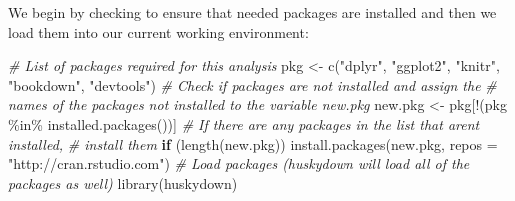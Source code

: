 \documentclass [11pt, proquest] {uwthesis}[2015/03/03]
\newenvironment{Shaded}{\begin{snugshade}}{\end{snugshade}}
\newcommand{\AttributeTok}[1]{\textcolor[rgb]{0.77,0.63,0.00}{#1}}
\newcommand{\CommentTok}[1]{\textcolor[rgb]{0.56,0.35,0.01}{\textit{#1}}}
\newcommand{\ControlFlowTok}[1]{\textcolor[rgb]{0.13,0.29,0.53}{\textbf{#1}}}
\newcommand{\FunctionTok}[1]{\textcolor[rgb]{0.00,0.00,0.00}{#1}}
\newcommand{\NormalTok}[1]{#1}
\newcommand{\OtherTok}[1]{\textcolor[rgb]{0.56,0.35,0.01}{#1}}
\newcommand{\SpecialCharTok}[1]{\textcolor[rgb]{0.00,0.00,0.00}{#1}}
\newcommand{\StringTok}[1]{\textcolor[rgb]{0.31,0.60,0.02}{#1}}
\begin{document}
We begin by checking to ensure that needed packages are installed and then we load them into our current working environment:
\begin{Shaded}
\begin{Highlighting}[]
\CommentTok{\# List of packages required for this analysis}
\NormalTok{pkg }\OtherTok{\textless{}{-}} \FunctionTok{c}\NormalTok{(}\StringTok{"dplyr"}\NormalTok{, }\StringTok{"ggplot2"}\NormalTok{, }\StringTok{"knitr"}\NormalTok{, }\StringTok{"bookdown"}\NormalTok{, }\StringTok{"devtools"}\NormalTok{)}
\CommentTok{\# Check if packages are not installed and assign the}
\CommentTok{\# names of the packages not installed to the variable new.pkg}
\NormalTok{new.pkg }\OtherTok{\textless{}{-}}\NormalTok{ pkg[}\SpecialCharTok{!}\NormalTok{(pkg }\SpecialCharTok{\%in\%} \FunctionTok{installed.packages}\NormalTok{())]}
\CommentTok{\# If there are any packages in the list that aren\textquotesingle{}t installed,}
\CommentTok{\# install them}
\ControlFlowTok{if}\NormalTok{ (}\FunctionTok{length}\NormalTok{(new.pkg))}
  \FunctionTok{install.packages}\NormalTok{(new.pkg, }\AttributeTok{repos =} \StringTok{"http://cran.rstudio.com"}\NormalTok{)}
\CommentTok{\# Load packages (huskydown will load all of the packages as well)}
\FunctionTok{library}\NormalTok{(huskydown)}
\end{Highlighting}
\end{Shaded}
\clearpage
\end{document}
